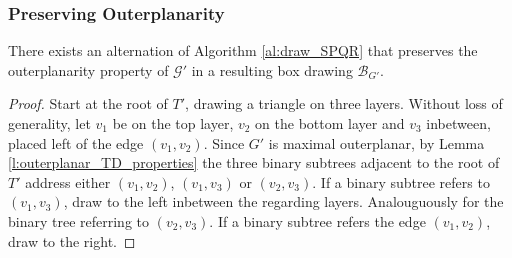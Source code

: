 \subsubsection{Preserving Outerplanarity}

\begin{theorem}
	There exists an alternation of Algorithm \ref{al:draw_SPQR} that preserves the outerplanarity property of $\mathcal{G'}$ in a resulting box drawing $\mathcal{B}_{G'}$.
\end{theorem}
\begin{proof}
Start at the root of $T'$, drawing a triangle on three layers. Without loss of generality, let $v_1$ be on the top layer, $v_2$ on the bottom layer and $v_3$ inbetween, placed left of the edge $(v_1,v_2)$.
Since $G'$ is maximal outerplanar, by Lemma \ref{l:outerplanar_TD_properties} the three binary subtrees adjacent to the root of $T'$ address either $(v_1,v_2)$, $(v_1,v_3)$ or $(v_2,v_3)$. If a binary subtree refers to $(v_1,v_3)$, draw to the left inbetween the regarding layers. Analouguously for the binary tree referring to $(v_2,v_3)$. If a binary subtree refers the edge $(v_1,v_2)$, draw to the right. 
	

\end{proof}
